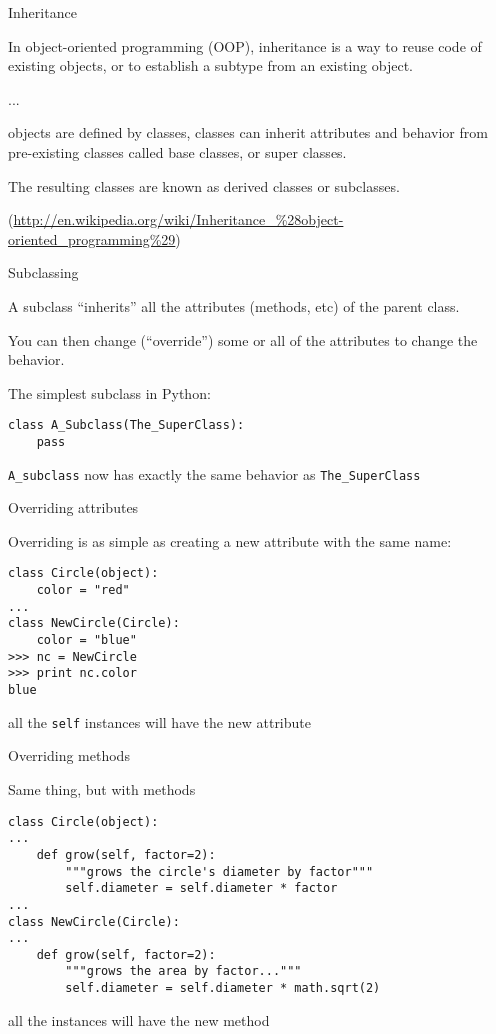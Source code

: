 \documentclass{beamer}
\begin{document}
\begin{frame}[fragile]{Inheritance}

In object-oriented programming (OOP), inheritance is a way to reuse code of
existing objects, or to establish a subtype from an existing object.

\vfill
...

\vfill
objects are defined by classes, classes can inherit attributes and behavior
from pre-existing classes called base classes, or super classes.

\vfill
The resulting classes are known as derived classes or subclasses.

\vfill
(\url{http://en.wikipedia.org/wiki/Inheritance_%28object-oriented_programming%29})
\end{frame} 

\begin{frame}[fragile]{Subclassing}

A subclass ``inherits'' all the attributes (methods, etc) of the parent class.

\vfill
You can then change (``override'') some or all of the attributes to change the behavior.

\vfill
The simplest subclass in Python:

\begin{verbatim}
class A_Subclass(The_SuperClass):
    pass
\end{verbatim}

\vfill
\verb|A_subclass| now has exactly the same behavior as \verb|The_SuperClass|

\end{frame} 

\begin{frame}[fragile]{Overriding attributes}

{\Large Overriding is as simple as creating a new attribute with the same name:}

\vfill
\begin{verbatim}
class Circle(object):
    color = "red"
...
class NewCircle(Circle):
    color = "blue"
>>> nc = NewCircle
>>> print nc.color
blue
\end{verbatim}

\vfill
all the \verb|self| instances will have the new attribute
\end{frame} 

\begin{frame}[fragile]{Overriding methods}

{\Large Same thing, but with methods}

\vfill
\begin{verbatim}
class Circle(object):
...
    def grow(self, factor=2):
        """grows the circle's diameter by factor"""
        self.diameter = self.diameter * factor
...
class NewCircle(Circle):
...
    def grow(self, factor=2):
        """grows the area by factor..."""
        self.diameter = self.diameter * math.sqrt(2)
\end{verbatim}
all the instances will have the new method
\end{frame} 
\end{document}
